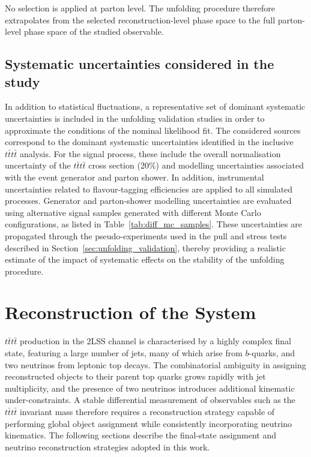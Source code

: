 No selection is applied at parton level. 
The unfolding procedure therefore extrapolates from the selected reconstruction-level phase space to the full parton-level phase space of the studied observable.

\subsection{Systematic uncertainties considered in the study}

In addition to statistical fluctuations, a representative set of dominant systematic uncertainties is included in the unfolding validation studies in order to approximate the conditions of the nominal likelihood fit.
The considered sources correspond to the dominant systematic uncertainties identified in the inclusive $t\bar{t}t\bar{t}$ analysis. 
For the signal process, these include the overall normalisation uncertainty of the $t\bar{t}t\bar{t}$ cross section (20\%) and modelling uncertainties associated with the event generator and parton shower. 
In addition, instrumental uncertainties related to flavour-tagging efficiencies are applied to all simulated processes.
Generator and parton-shower modelling uncertainties are evaluated using alternative signal samples generated with different Monte Carlo configurations, as listed in Table~\ref{tab:diff_mc_samples}. 
These uncertainties are propagated through the pseudo-experiments used in the pull and stress tests described in Section~\ref{sec:unfolding_validation}, thereby providing a realistic estimate of the impact of systematic effects on the stability of the unfolding procedure.

\section{Reconstruction of the \tttthead{} System}

$t\bar{t}t\bar{t}$ production in the 2LSS channel is characterised by a highly complex final state, featuring a large number of jets, many of which arise from $b$-quarks, and two neutrinos from leptonic top decays. 
The combinatorial ambiguity in assigning reconstructed objects to their parent top quarks grows rapidly with jet multiplicity, and the presence of two neutrinos introduces additional kinematic under-constraints. 
A stable differential measurement of observables such as the $t\bar{t}t\bar{t}$ invariant mass therefore requires a reconstruction strategy capable of performing global object assignment while consistently incorporating neutrino kinematics.
The following sections describe the final-state assignment and neutrino reconstruction strategies adopted in this work.

